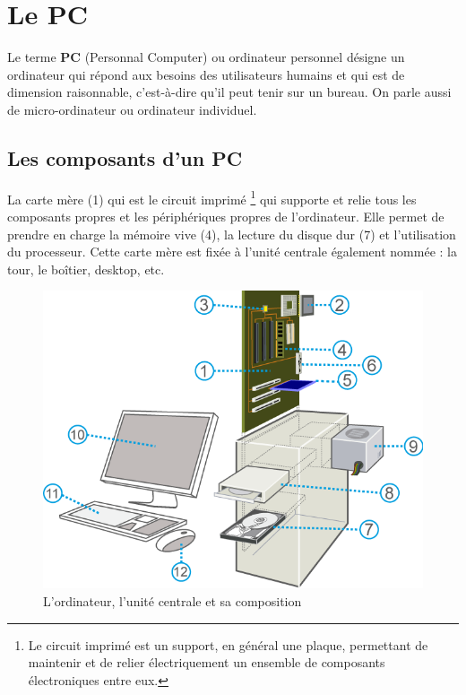 \section{Le PC}
Le terme \textbf{PC} (Personnal Computer) ou ordinateur personnel désigne un ordinateur qui répond aux besoins des utilisateurs humains et qui est de dimension raisonnable, c'est-à-dire qu'il peut tenir sur un bureau. On parle aussi de micro-ordinateur ou ordinateur individuel. 



\subsection{Les composants  d'un PC}
La carte mère (1) qui est le circuit imprimé \footnote{Le circuit imprimé est un support, en général une plaque, permettant de maintenir et de relier électriquement un ensemble de composants électroniques entre eux.} qui supporte et relie tous les composants propres et les périphériques propres de l'ordinateur. Elle permet de prendre en charge la mémoire vive (4), la lecture du disque dur (7) et l'utilisation du processeur. Cette carte mère est fixée à l'unité centrale également nommée : la tour, le boîtier, desktop, etc.

\begin{center}
	\begin{figure}[h]
		\includegraphics[scale=.6]{Images/ordinateur/composants}
		\caption{L'ordinateur, l'unité centrale et sa composition}
		\label{composants}
	\end{figure}
\end{center}

